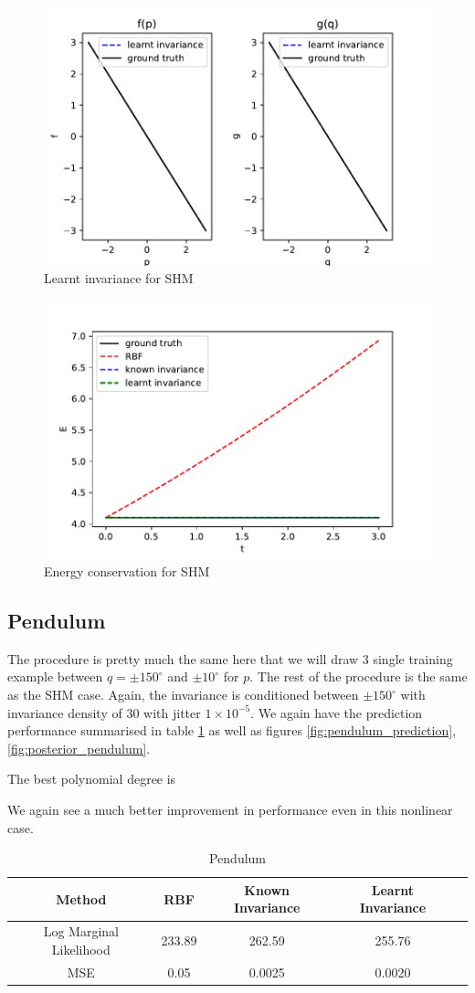 \documentclass{statsmsc}
\begin{document}
\begin{figure}[H] 
  \includegraphics[width=0.6\linewidth]{../codes/figures/shm_learnt.pdf}
  \centering
  \caption{Learnt invariance for SHM}
  \label{fig:shm_learnt}
\end{figure}

\begin{figure}[H] 
  \includegraphics[width=0.6\linewidth]{../codes/figures/shm_energy.pdf}
  \centering
  \caption{Energy conservation for SHM}
  \label{fig:shm_energy}
\end{figure}


\subsection{Pendulum}
The procedure is pretty much the same here that we will draw 3 single training example between $q=\pm 150^{\circ}$ and $\pm 10^{\circ}$ for $p$.
The rest of the procedure is the same as the SHM case.
Again, the invariance is conditioned between $\pm 150^{\circ}$ with invariance density of 30 with jitter $1\times 10^{-5}$.
We again have the prediction performance summarised in table \ref{tab:pendulum_performance} as well as figures \ref{fig:pendulum_prediction}, \ref{fig:posterior_pendulum}.

The best polynomial degree is  

We again see a much better improvement in performance even in this nonlinear case. 
\begin{table}[H]
  \centering
  \begin{tabular}{ c c c c c}
    \hline
Method           & RBF & Known Invariance&  Learnt Invariance\\
                    \hline
Log Marginal Likelihood & 233.89 & 262.59 & 255.76 &  \\
MSE & 0.05 & 0.0025 & 0.0020 \\
    \hline
  \end{tabular}
  \caption{Pendulum }
  \label{tab:pendulum_performance}
\end{table}
\end{document}
